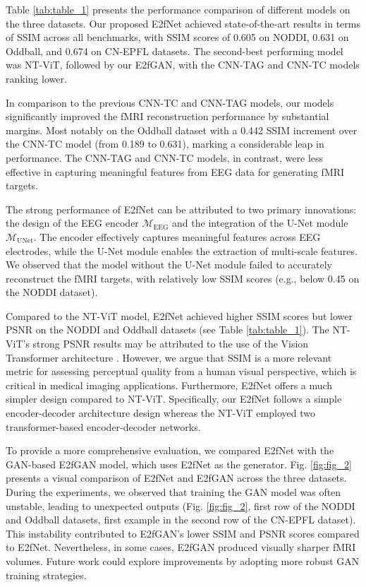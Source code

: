 Table \ref{tab:table_1} presents the performance comparison of different models on the three datasets. 
Our proposed E2fNet achieved state-of-the-art results in terms of SSIM across all benchmarks, with SSIM scores of 0.605 on NODDI, 0.631 on Oddball, and 0.674 on CN-EPFL datasets. 
The second-best performing model was NT-ViT, followed by our E2fGAN, with the CNN-TAG and CNN-TC models ranking lower.

In comparison to the previous CNN-TC and CNN-TAG models, our models significantly improved the fMRI reconstruction performance by substantial margins. 
Most notably on the Oddball dataset with a 0.442 SSIM increment over the CNN-TC \cite{liu2019convolutional} model (from 0.189 to 0.631), marking a considerable leap in performance. 
The CNN-TAG and CNN-TC models, in contrast, were less effective in capturing meaningful features from EEG data for generating fMRI targets. 

The strong performance of E2fNet can be attributed to two primary innovations: the design of the EEG encoder $\mathcal{M}_{\mathrm{EEG}}$ and the integration of the U-Net module $\mathcal{M}_{\mathrm{UNet}}$. 
The encoder effectively captures meaningful features across EEG electrodes, while the U-Net module enables the extraction of multi-scale features. 
We observed that the model without the U-Net module failed to accurately reconstruct the fMRI targets, with relatively low SSIM scores (e.g., below 0.45 on the NODDI dataset). 

Compared to the NT-ViT model, E2fNet achieved higher SSIM scores but lower PSNR on the NODDI and Oddball datasets (see Table \ref{tab:table_1}). 
The NT-ViT’s strong PSNR results may be attributed to the use of the Vision Transformer architecture \cite{dosovitskiy21vit}. 
However, we argue that SSIM is a more relevant metric for assessing perceptual quality from a human visual perspective, which is critical in medical imaging applications. 
Furthermore, E2fNet offers a much simpler design compared to NT-ViT. 
Specifically, our E2fNet follows a simple encoder-decoder architecture design whereas the NT-ViT employed two transformer-based encoder-decoder networks. 

To provide a more comprehensive evaluation, we compared E2fNet with the GAN-based E2fGAN model, which uses E2fNet as the generator. 
Fig. \ref{fig:fig_2} presents a visual comparison of E2fNet and E2fGAN across the three datasets. 
During the experiments, we observed that training the GAN model was often unstable, leading to unexpected outputs (Fig. \ref{fig:fig_2}, first row of the NODDI and Oddball datasets, first example in the second row of the CN-EPFL dataset). 
This instability contributed to E2fGAN's lower SSIM and PSNR scores compared to E2fNet. 
Nevertheless, in some cases, E2fGAN produced visually sharper fMRI volumes. 
Future work could explore improvements by adopting more robust GAN training strategies.

